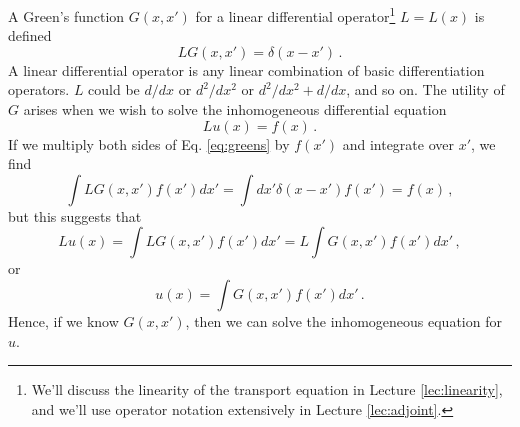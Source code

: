A Green's function $G(x,x')$ for a linear differential operator\footnote{We'll discuss the linearity of the transport equation in Lecture \ref{lec:linearity}, and we'll use operator notation extensively in Lecture \ref{lec:adjoint}.} $L=L(x)$ is defined
\begin{equation}
 LG(x,x') = \delta(x-x') \, .
 \label{eq:greens}
\end{equation}
A linear differential operator is any linear combination of basic differentiation operators.  $L$ could be $d/dx$ or $d^2/dx^2$ or $d^2/dx^2 + d/dx$, and so on.  The utility of $G$ arises when we wish to solve the inhomogeneous differential equation
\begin{equation}
 Lu(x) = f(x) \, .
 \label{eq:diffeq}
\end{equation}
If we multiply both sides of Eq. \ref{eq:greens} by $f(x')$ and integrate over $x'$, we find
\begin{equation}
 \int LG(x,x')f(x')dx' = \int dx' \delta(x-x') f(x') = f(x) \, ,
\end{equation}
but this suggests that
\begin{equation}
 Lu(x) = \int LG(x,x')f(x')dx' = L \int G(x,x')f(x')dx'  \, ,
\end{equation}
or 
\begin{equation}
 u(x) = \int G(x,x')f(x')dx'  \, .
\end{equation}
Hence, if we know $G(x,x')$, then we can solve the inhomogeneous equation for $u$.  

